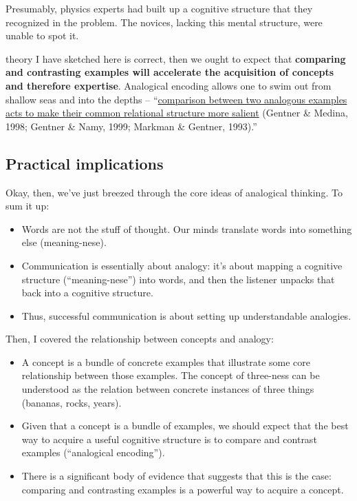 Presumably, physics experts had built up a cognitive
structure that they recognized in the problem. The novices, lacking this
mental structure, were unable to spot it.

 theory I have sketched here is correct, then we ought to expect
that \textbf{comparing and contrasting examples will accelerate the
acquisition of concepts and therefore expertise}. Analogical encoding
allows one to swim out from shallow seas and into the depths --
``\href{http://onlinelibrary.wiley.com/doi/10.1111/j.1551-6709.2009.01070.x/full}{comparison
between two analogous examples acts to make their common relational
structure more salient} (Gentner \& Medina, 1998; Gentner \& Namy, 1999;
Markman \& Gentner, 1993).''

\subsection{Practical implications}\label{practical-implications}

Okay, then, we've just breezed through the core ideas of analogical
thinking. To sum it up:

\begin{itemize}
\itemsep1pt\parskip0pt
\item
  Words are not the stuff of thought. Our minds translate words into
  something else (meaning-nese).
\item
  Communication is essentially about analogy: it's about mapping a
  cognitive structure (``meaning-nese'') into words, and then the
  listener unpacks that back into a cognitive structure.
\item
  Thus, successful communication is about setting up understandable
  analogies.
\end{itemize}

Then, I covered the relationship between concepts and analogy:

\begin{itemize}
\itemsep1pt\parskip0pt
\item
  A concept is a bundle of concrete examples that illustrate some core
  relationship between those examples. The concept of three-ness can be
  understood as the relation between concrete instances of three things
  (bananas, rocks, years).
\item
  Given that a concept is a bundle of examples, we should expect that
  the best way to acquire a useful cognitive structure is to compare and
  contrast examples (``analogical encoding'').
\item
  There is a significant body of evidence that suggests that this is the
  case: comparing and contrasting examples is a powerful way to acquire
  a concept.
\end{itemize}

